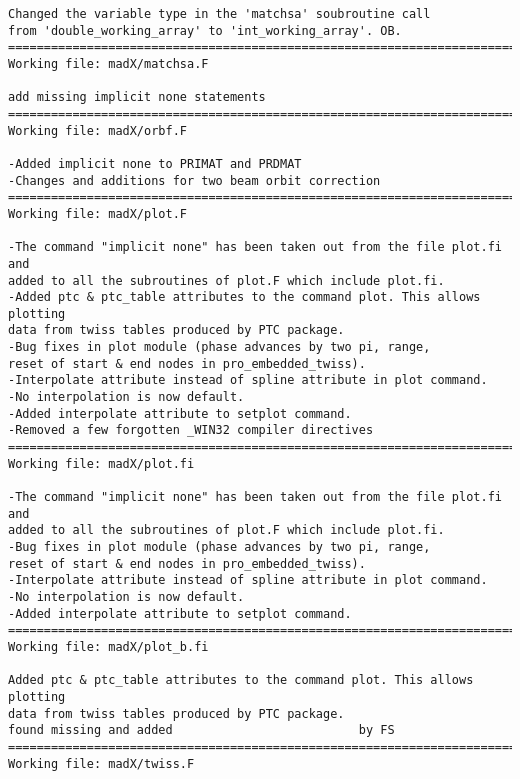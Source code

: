 \begin{verbatim}
Changed the variable type in the 'matchsa' soubroutine call
from 'double_working_array' to 'int_working_array'. OB.
=============================================================================
Working file: madX/matchsa.F

add missing implicit none statements
=============================================================================
Working file: madX/orbf.F

-Added implicit none to PRIMAT and PRDMAT
-Changes and additions for two beam orbit correction
=============================================================================
Working file: madX/plot.F

-The command "implicit none" has been taken out from the file plot.fi and
added to all the subroutines of plot.F which include plot.fi.
-Added ptc & ptc_table attributes to the command plot. This allows plotting
data from twiss tables produced by PTC package.
-Bug fixes in plot module (phase advances by two pi, range,
reset of start & end nodes in pro_embedded_twiss).
-Interpolate attribute instead of spline attribute in plot command.
-No interpolation is now default.
-Added interpolate attribute to setplot command.
-Removed a few forgotten _WIN32 compiler directives
=============================================================================
Working file: madX/plot.fi

-The command "implicit none" has been taken out from the file plot.fi and
added to all the subroutines of plot.F which include plot.fi.
-Bug fixes in plot module (phase advances by two pi, range,
reset of start & end nodes in pro_embedded_twiss).
-Interpolate attribute instead of spline attribute in plot command.
-No interpolation is now default.
-Added interpolate attribute to setplot command.
=============================================================================
Working file: madX/plot_b.fi

Added ptc & ptc_table attributes to the command plot. This allows plotting
data from twiss tables produced by PTC package.
found missing and added                          by FS
=============================================================================
Working file: madX/twiss.F


\end{verbatim}
